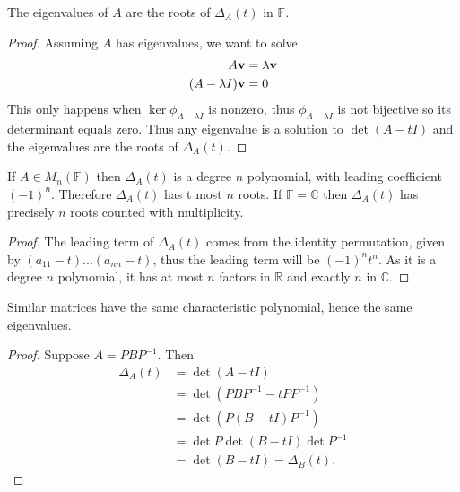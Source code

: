 \begin{prop}
    The eigenvalues of $A$ are the roots of $\Delta_A(t)$ in $\mathbb{F}$.
\end{prop}
\begin{proof}
  Assuming $A$ has eigenvalues, we want to solve 
  \begin{align*}
    A \bf{v} &= \lambda \bf{v} \\
    (A - \lambda I) \bf{v} &= 0
  \end{align*}
  This only happens when $\ker \phi_{A -\lambda I}$ is nonzero, thus $\phi_{A - \lambda I}$ is not bijective so its determinant equals zero. Thus any eigenvalue is a solution to $\det(A - t I)$ and the eigenvalues are the roots of $\Delta_A(t)$.
\end{proof}

\begin{lemma}
    If $A \in M_n(\mathbb{F})$ then $\Delta_A(t)$ is a degree $n$ polynomial, with leading coefficient $(-1)^n$. Therefore $\Delta_A(t)$ has t most $n$ roots.
    If $\mathbb{F} = \mathbb{C}$ then $\Delta_A(t)$ has precisely $n$ roots counted with multiplicity.
\end{lemma}
\begin{proof}
  The leading term of $\Delta_A(t)$ comes from the identity permutation, given by $(a_{1 1} - t)...(a_{n n} - t)$, thus the leading term will be $(-1)^n t^n$. As it is a degree $n$ polynomial, it has at most $n$ factors in $\mathbb{R}$ and exactly $n$ in $\mathbb{C}$.
\end{proof}

\begin{lemma}
    Similar matrices have the same characteristic polynomial, hence the same eigenvalues.
\end{lemma}
\begin{proof}
  Suppose $A = P B P^{-1}$. Then
  \begin{align*}
    \Delta_A(t) &= \det (A - t I) \\ &= \det(PBP^{-1} - tP P^{-1}) \\
                &= \det(P (B - tI)P^{-1}) \\ 
                &= \det P \det (B - tI) \det P^{-1} \\
                &= \det(B - tI) = \Delta_B(t)
  .\end{align*}
\end{proof}

